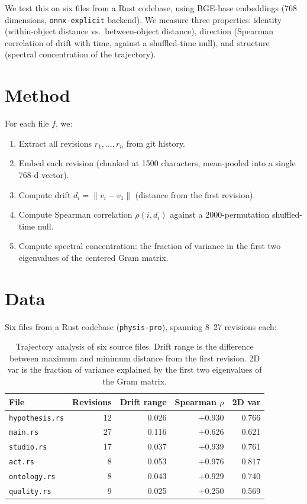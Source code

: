 \documentclass[11pt]{article}
\begin{document}
We test this on six files from a Rust codebase, using BGE-base embeddings
(768 dimensions, \texttt{onnx-explicit} backend). We measure three
properties: identity (within-object distance vs.\ between-object
distance), direction (Spearman correlation of drift with time, against a
shuffled-time null), and structure (spectral concentration of the
trajectory).

\section{Method}

For each file $f$, we:
\begin{enumerate}
\item Extract all revisions $r_1, \ldots, r_n$ from git history.
\item Embed each revision (chunked at 1500 characters, mean-pooled into a
single 768-d vector).
\item Compute drift $d_i = \|v_i - v_1\|$ (distance from the first revision).
\item Compute Spearman correlation $\rho(i, d_i)$ against a 2000-permutation
shuffled-time null.
\item Compute spectral concentration: the fraction of variance in the first
two eigenvalues of the centered Gram matrix.
\end{enumerate}

\section{Data}

Six files from a Rust codebase (\texttt{physis-pro}), spanning 8--27
revisions each:

\begin{table}[h]
\centering
\begin{tabular}{lrrrr}
\toprule
\textbf{File} & \textbf{Revisions} & \textbf{Drift range} & \textbf{Spearman $\rho$} & \textbf{2D var} \\
\midrule
\texttt{hypothesis.rs} & 12 & 0.026 & +0.930 & 0.766 \\
\texttt{main.rs} & 27 & 0.116 & +0.626 & 0.621 \\
\texttt{studio.rs} & 17 & 0.037 & +0.939 & 0.761 \\
\texttt{act.rs} & 8 & 0.053 & +0.976 & 0.817 \\
\texttt{ontology.rs} & 8 & 0.043 & +0.929 & 0.740 \\
\texttt{quality.rs} & 9 & 0.025 & +0.250 & 0.569 \\
\bottomrule
\end{tabular}
\caption{Trajectory analysis of six source files. Drift range is the
difference between maximum and minimum distance from the first revision.
2D var is the fraction of variance explained by the first two eigenvalues
of the Gram matrix.}
\label{tab:trajectories}
\end{table}
\end{document}
